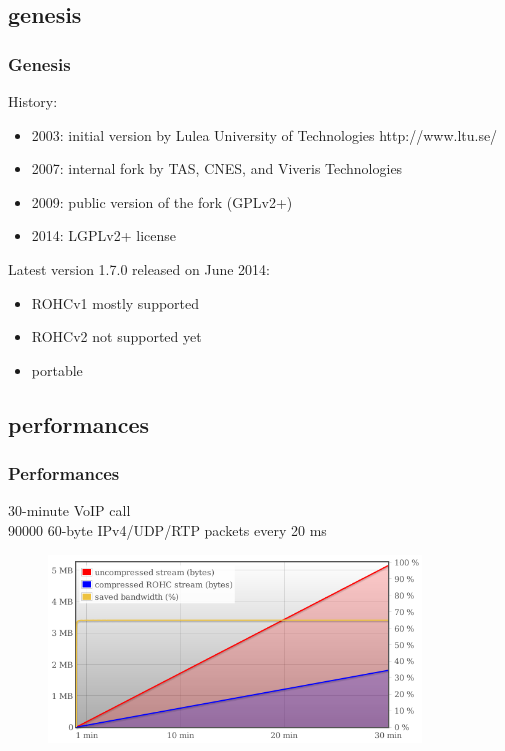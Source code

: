 \documentclass[utf8]{beamer}
\begin{document}
\subsection{genesis}
\begin{frame}
	\frametitle{Genesis}
	History:
	\begin{itemize}
		\item 2003: initial version by Lulea University of Technologies {\tiny http://www.ltu.se/}
		\item 2007: internal fork by TAS, CNES, and Viveris Technologies
		\item 2009: public version of the fork (GPLv2+)
		\item 2014: LGPLv2+ license
	\end{itemize}
	\pause
	Latest version 1.7.0 released on June 2014:
	\begin{itemize}
		\item ROHCv1 mostly supported
		\item ROHCv2 not supported yet
		\item portable
	\end{itemize}
\end{frame}

\subsection{performances}
\begin{frame}
	\frametitle{Performances}
	30-minute VoIP call\\
	{\tiny 90000 60-byte IPv4/UDP/RTP packets every 20 ms}
	\begin{figure}
		\includegraphics[height=50mm]{images/rohc_perfs.png}
	\end{figure}
\end{frame}
\end{document}

